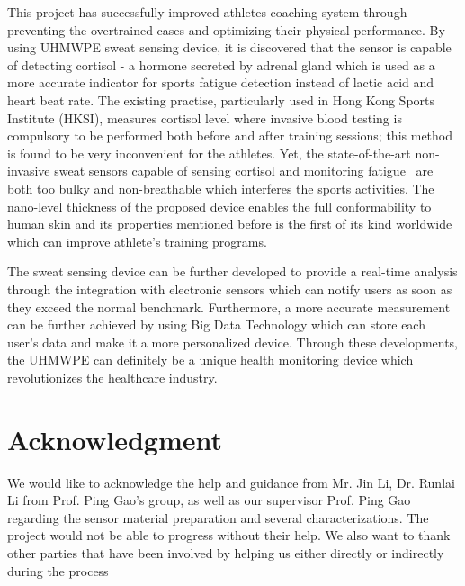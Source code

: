 \documentclass[journal]{IEEEtran}
\begin{document}
This project has successfully improved athletes coaching system through preventing the overtrained cases and optimizing their physical performance. By using UHMWPE sweat sensing device, it is discovered that the sensor is capable of detecting cortisol - a hormone secreted by adrenal gland which is used as a more accurate indicator for sports fatigue detection instead of lactic acid and heart beat rate. The existing practise, particularly used in Hong Kong Sports Institute (HKSI), measures cortisol level where invasive blood testing is compulsory to be performed both before and after training sessions; this method is found to be very inconvenient for the athletes. Yet, the state-of-the-art non-invasive sweat sensors capable of sensing cortisol and monitoring fatigue~\cite{SkinSystems, UHMWPEMembrane, LabOnSkin} are both too bulky and non-breathable which interferes the sports activities. The nano-level thickness of the proposed device enables the full conformability to human skin and its properties mentioned before is the first of its kind worldwide which can improve athlete’s training programs.

The sweat sensing device can be further developed to provide a real-time analysis through the integration with electronic sensors which can notify users as soon as they exceed the normal benchmark. Furthermore, a more accurate measurement can be further achieved by using Big Data Technology which can store each user’s data and make it a more personalized device. Through these developments, the UHMWPE can definitely be a unique health monitoring device which revolutionizes the healthcare industry. 


\appendices
\section*{Acknowledgment}

We would like to acknowledge the help and guidance from Mr. Jin Li, Dr. Runlai Li from Prof. Ping  Gao’s  group, as well as our supervisor Prof. Ping Gao  regarding  the  sensor  material  preparation  and  several characterizations. The project would not be able to progress without their help. We also want to thank other parties that have been involved by helping us either directly or indirectly during the process

\ifCLASSOPTIONcaptionsoff
  \newpage
\fi



\end{document}
